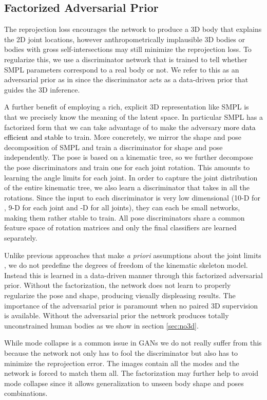 \documentclass[10pt,twocolumn,letterpaper]{article}
\newcommand{\blue}[1]{\textcolor{black}{#1}}
\begin{document}
\subsection{Factorized Adversarial Prior}
The reprojection loss encourages the network to produce a 3D body that explains the
2D joint locations, however anthropometrically implausible 3D bodies or bodies with gross self-intersections may still minimize the reprojection loss.
To regularize this, we use a discriminator network  that is trained to tell
whether SMPL parameters correspond to a real body or not. We refer to this as an
adversarial prior as in \cite{Fish2017} since the discriminator acts as a
data-driven prior that guides the 3D inference. 

A further benefit of employing a rich, explicit 3D representation like SMPL is that we precisely know
the meaning of the latent space. In particular SMPL has a factorized form that
we can take advantage of to make the adversary \blue{more data efficient and stable} to train. More concretely, we mirror the shape and pose decomposition of SMPL
and train a discriminator for shape and pose independently. 
The pose is based on a kinematic tree, so we further decompose the pose
discriminators and train one for each joint rotation. This amounts to learning the angle limits for each
joint. In order to capture the joint distribution of the entire kinematic tree,
we also learn a discriminator that takes in all the rotations.
Since the input to each discriminator is very low dimensional (10-D for
, 9-D for each joint and -D for all joints), they can each be small
networks, making them rather stable to train. All pose discriminators share a
common feature space of rotation matrices and only the final classifiers are learned
separately. 

Unlike previous approaches that make \emph{a priori} assumptions about the joint
limits \cite{SMPLify,Xingyi2016}, we do not predefine the degrees of freedom of
the kinematic skeleton model. Instead this is learned in a data-driven
manner through this factorized adversarial prior. Without the factorization, the
network does not learn to properly regularize the pose and shape, producing
visually displeasing results. 
The importance of the adversarial prior is paramount when no paired 3D supervision is available. Without the adversarial
prior the network produces totally unconstrained human bodies as we show in
section \ref{sec:no3d}. 

While mode collapse is a common issue in GANs
\cite{goodfellow2014generative} we do not really suffer from this because the
network not only has to fool the discriminator but also has to minimize the
reprojection error. The images contain all the modes and the network is forced
to match them all. The factorization may further help to avoid mode collapse
since it allows generalization to unseen body shape and poses combinations. 
\end{document}
